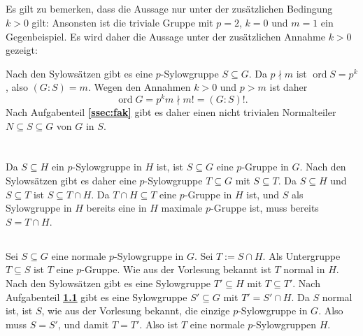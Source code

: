 \documentclass[a4paper,10pt]{article}
\theoremstyle{definition}
\newcommand{\ord}{\operatorname{ord}}
\begin{document}
\subsection{}
Es gilt zu bemerken, dass die Aussage nur unter der zusätzlichen Bedingung $k > 0$ gilt: Ansonsten ist die triviale Gruppe mit $p=2$, $k=0$ und $m=1$ ein Gegenbeispiel. Es wird daher die Aussage unter der zusätzlichen Annahme $k > 0$ gezeigt:

Nach den Sylowsätzen gibt es eine $p$-Sylowgruppe $S \subseteq G$. Da $p \nmid m$ ist $\ord S = p^k$, also $(G : S) = m$. Wegen den Annahmen $k > 0$ und $p > m$ ist daher
\[
\ord G = p^k m \nmid m! = (G : S)!.
\]
Nach Aufgabenteil \textbf{\ref{ssec:fak}} gibt es daher einen nicht trivialen Normalteiler $N \subseteq S \subseteq G$ von $G$ in $S$.





\section{}


\subsection{}\label{ssc:Sylowschnitt}
Da $S \subseteq H$ ein $p$-Sylowgruppe in $H$ ist, ist $S \subseteq G$ eine $p$-Gruppe in $G$. Nach den Sylowsätzen gibt es daher eine $p$-Sylowgruppe $T \subseteq G$ mit $S \subseteq T$. Da $S \subseteq H$ und $S \subseteq T$ ist $S \subseteq T \cap H$. Da $T \cap H \subseteq T$ eine $p$-Gruppe in $H$ ist, und $S$ als Sylowgruppe in $H$ bereits eine in $H$ maximale $p$-Gruppe ist, muss bereits $S = T \cap H$.


\subsection{}
Sei $S \subseteq G$ eine normale $p$-Sylowgruppe in $G$. Sei $T := S \cap H$. Als Untergruppe $T \subseteq S$ ist $T$ eine $p$-Gruppe. Wie aus der Vorlesung bekannt ist $T$ normal in $H$. Nach den Sylowsätzen gibt es eine Sylowgruppe $T' \subseteq H$ mit $T \subseteq T'$. Nach Aufgabenteil \textbf{\ref{ssc:Sylowschnitt}} gibt es eine Sylowgruppe $S' \subseteq G$ mit $T' = S' \cap H$. Da $S$ normal ist, ist $S$, wie aus der Vorlesung bekannt, die einzige $p$-Sylowgruppe in $G$. Also muss $S = S'$, und damit $T = T'$. Also ist $T$ eine normale $p$-Sylowgruppen $H$.
\end{document}
